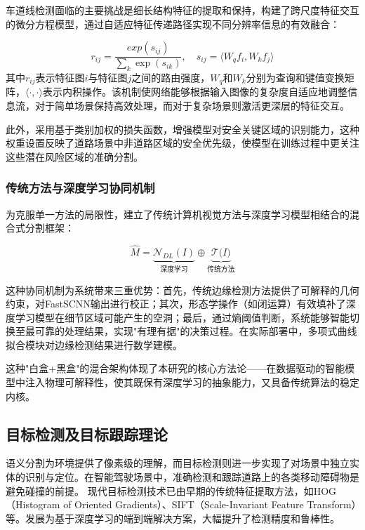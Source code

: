 \documentclass[a4paper, UTF8, fontsize=12pt]{ctexart} %
\numberwithin{equation}{section} %
\begin{document}
车道线检测面临的主要挑战是细长结构特征的提取和保持，构建了跨尺度特征交互的微分方程模型，通过自适应特征传递路径实现不同分辨率信息的有效融合：

\begin{equation}
\label{eq:routing}
r_{ij} = \frac{exp(s_{ij})}{\sum_{k}^{}\exp(s_{ik})},\quad s_{ij} = \langle W_{q}f_{i},W_{k}f_{j}\rangle
\end{equation}
其中$r_{ij}$表示特征图$i$与特征图$j$之间的路由强度，$W_q$和$W_k$分别为查询和键值变换矩阵，$\langle\cdot,\cdot\rangle$表示内积操作。该机制使网络能够根据输入图像的复杂度自适应地调整信息流，对于简单场景保持高效处理，而对于复杂场景则激活更深层的特征交互。

此外，采用基于类别加权的损失函数，增强模型对安全关键区域的识别能力，这种权重设置反映了道路场景中非道路区域的安全优先级，使模型在训练过程中更关注这些潜在风险区域的准确分割。

\subsubsection{传统方法与深度学习协同机制}

为克服单一方法的局限性，建立了传统计算机视觉方法与深度学习模型相结合的混合式分割框架：

\begin{equation}
\label{eq:hybrid}
\widehat{M} = \underset{深度学习}{\underbrace{\mathcal{N}_{DL}(I)}} \oplus \underset{传统方法}{\underbrace{\mathcal{T(}I)}}
\end{equation}

这种协同机制为系统带来三重优势：首先，传统边缘检测方法提供了可解释的几何约束，对FastSCNN输出进行校正；其次，形态学操作（如闭运算）有效填补了深度学习模型在细节区域可能产生的空洞；最后，通过熵阈值判断，系统能够智能切换至最可靠的处理结果，实现"有理有据"的决策过程。在实际部署中，多项式曲线拟合模块对边缘检测结果进行数学建模。

这种"白盒+黑盒"的混合架构体现了本研究的核心方法论——在数据驱动的智能模型中注入物理可解释性，使其既保有深度学习的抽象能力，又具备传统算法的稳定内核。

\subsection{目标检测及目标跟踪理论}


语义分割为环境提供了像素级的理解，而目标检测则进一步实现了对场景中独立实体的识别与定位。在智能驾驶场景中，准确检测和跟踪道路上的各类移动障碍物是避免碰撞的前提。
现代目标检测技术已由早期的传统特征提取方法，如HOG（Histogram of Oriented Gradients）、SIFT（Scale-Invariant Feature Transform）等\cite{dalal2005histograms,lowe2004distinctive}。发展为基于深度学习的端到端解决方案，大幅提升了检测精度和鲁棒性。
\end{document}
